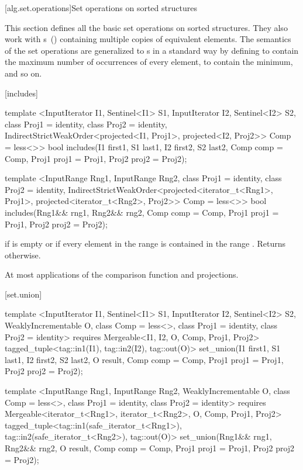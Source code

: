 [alg.set.operations]{Set operations on sorted structures}

\pnum
This section defines all the basic set operations on sorted structures.
They also work with
s~()
containing multiple copies of equivalent elements.
The semantics of the set operations are generalized to
s
in a standard way by defining
to contain the maximum number of occurrences of every element,
to contain the minimum, and so on.

[includes]{}

%
\begin{itemdecl}
template <InputIterator I1, Sentinel<I1> S1, InputIterator I2, Sentinel<I2> S2,
    class Proj1 = identity, class Proj2 = identity,
    IndirectStrictWeakOrder<projected<I1, Proj1>, projected<I2, Proj2>> Comp = less<>>
  bool
    includes(I1 first1, S1 last1, I2 first2, S2 last2, Comp comp = Comp{},
             Proj1 proj1 = Proj1{}, Proj2 proj2 = Proj2{});

template <InputRange Rng1, InputRange Rng2, class Proj1 = identity,
    class Proj2 = identity,
    IndirectStrictWeakOrder<projected<iterator_t<Rng1>, Proj1>,
      projected<iterator_t<Rng2>, Proj2>> Comp = less<>>
  bool
    includes(Rng1&& rng1, Rng2&& rng2, Comp comp = Comp{},
             Proj1 proj1 = Proj1{}, Proj2 proj2 = Proj2{});
\end{itemdecl}

\begin{itemdescr}
\pnum
\returns
{}
if  is empty or
if every element in the range
is contained in the range
.
Returns
otherwise.

\pnum
\complexity
At most
applications of the comparison function and projections.
\end{itemdescr}

[set.union]{}

%
\begin{itemdecl}
template <InputIterator I1, Sentinel<I1> S1, InputIterator I2, Sentinel<I2> S2,
    WeaklyIncrementable O, class Comp = less<>, class Proj1 = identity, class Proj2 = identity>
  requires Mergeable<I1, I2, O, Comp, Proj1, Proj2>
  tagged_tuple<tag::in1(I1), tag::in2(I2), tag::out(O)>
    set_union(I1 first1, S1 last1, I2 first2, S2 last2, O result, Comp comp = Comp{},
              Proj1 proj1 = Proj1{}, Proj2 proj2 = Proj2{});

template <InputRange Rng1, InputRange Rng2, WeaklyIncrementable O,
    class Comp = less<>, class Proj1 = identity, class Proj2 = identity>
  requires Mergeable<iterator_t<Rng1>, iterator_t<Rng2>, O, Comp, Proj1, Proj2>
  tagged_tuple<tag::in1(safe_iterator_t<Rng1>),
               tag::in2(safe_iterator_t<Rng2>),
               tag::out(O)>
    set_union(Rng1&& rng1, Rng2&& rng2, O result, Comp comp = Comp{},
              Proj1 proj1 = Proj1{}, Proj2 proj2 = Proj2{});
\end{itemdecl}

